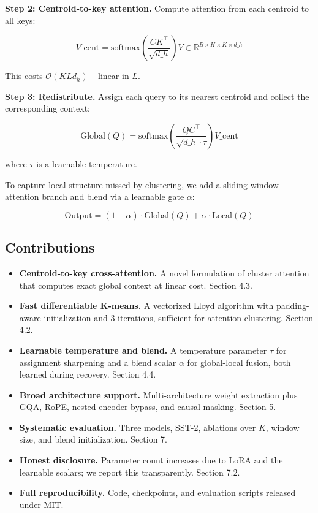 \textbf{Step 2: Centroid-to-key attention.} Compute attention from each centroid 
to all keys:

\[
V\_{\text{cent}} = \text{softmax}\!\left(\frac{C K^\top}{\sqrt{d\_h}}\right) V \in \mathbb{R}^{B \times H \times K \times d\_h}
\]

This costs $\mathcal{O}(K L d_h)$ -- linear in $L$.

\textbf{Step 3: Redistribute.} Assign each query to its nearest centroid and 
collect the corresponding context:

\[
\text{Global}(Q) = \text{softmax}\!\left(\frac{Q C^\top}{\sqrt{d\_h} \cdot \tau}\right) V\_{\text{cent}}
\]

where $\tau$ is a learnable temperature.

To capture local structure missed by clustering, we add a sliding-window 
attention branch and blend via a learnable gate $\alpha$:

\[
\text{Output} = (1 - \alpha) \cdot \text{Global}(Q) + \alpha \cdot \text{Local}(Q)
\]

\subsection{Contributions}

\begin{itemize}
\item \textbf{Centroid-to-key cross-attention.} A novel formulation of cluster
  attention that computes exact global context at linear cost. Section 4.3.
\item \textbf{Fast differentiable K-means.} A vectorized Lloyd algorithm with
  padding-aware initialization and 3 iterations, sufficient for attention
  clustering. Section 4.2.
\item \textbf{Learnable temperature and blend.} A temperature parameter $\tau$ for
  assignment sharpening and a blend scalar $\alpha$ for global-local fusion,
  both learned during recovery. Section 4.4.
\item \textbf{Broad architecture support.} Multi-architecture weight extraction plus
  GQA, RoPE, nested encoder bypass, and causal masking. Section 5.
\item \textbf{Systematic evaluation.} Three models, SST-2, ablations over $K$,
  window size, and blend initialization. Section 7.
\item \textbf{Honest disclosure.} Parameter count increases due to LoRA and the
  learnable scalars; we report this transparently. Section 7.2.
\item \textbf{Full reproducibility.} Code, checkpoints, and evaluation scripts
  released under MIT.

\end{itemize}

